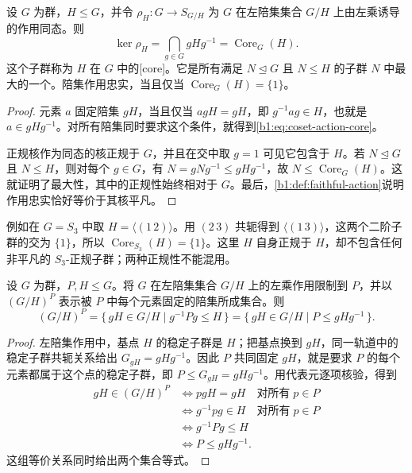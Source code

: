 \begin{proposition}[陪集作用的正规核]\label{b1:prop:coset-action-core}
	设 \(G\) 为群，\(H\leq G\)，并令 \(\rho_H:G\rightarrow S_{G/H}\) 为 \(G\) 在左陪集集合 \(G/H\) 上由左乘诱导的作用同态。则
	\begin{equation}\label{b1:eq:coset-action-core}
		\ker\rho_H=\bigcap_{g\in G}gHg^{-1} =\operatorname{Core}_G(H).
	\end{equation}
	这个子群称为 \(H\) 在 \(G\) 中的[core]。它是所有满足 \(N\trianglelefteq G\) 且 \(N\leq H\) 的子群 \(N\) 中最大的一个。陪集作用忠实，当且仅当 \(\operatorname{Core}_G(H)=\{1\}\)。
\end{proposition}
\begin{proof}
	元素 \(a\) 固定陪集 \(gH\)，当且仅当 \(agH=gH\)，即 \(g^{-1}ag\in H\)，也就是 \(a\in gHg^{-1}\)。对所有陪集同时要求这个条件，就得到\eqref{b1:eq:coset-action-core}。

	正规核作为同态的核正规于 \(G\)，并且在交中取 \(g=1\) 可见它包含于 \(H\)。若 \(N\trianglelefteq G\) 且 \(N\leq H\)，则对每个 \(g\in G\)，有 \(N=gNg^{-1}\leq gHg^{-1}\)，故 \(N\leq\operatorname{Core}_G(H)\)。这就证明了最大性，其中的正规性始终相对于 \(G\)。最后，\cref{b1:def:faithful-action}说明作用忠实恰好等价于其核平凡。
\end{proof}

例如在 \(G=S_3\) 中取 \(H=\bigl\langle(1\,2)\bigr\rangle\)。用 \((2\,3)\) 共轭得到 \(\bigl\langle(1\,3)\bigr\rangle\)，这两个二阶子群的交为 \(\{1\}\)，所以 \(\operatorname{Core}_{S_3}(H)=\{1\}\)。这里 \(H\) 自身正规于 \(H\)，却不包含任何非平凡的 \(S_3\)-正规子群；两种正规性不能混用。

\begin{corollary}[子群共同固定的陪集]\label{b1:cor:fixed-cosets-conjugate-containment}
	设 \(G\) 为群，\(P,H\leq G\)。将 \(G\) 在左陪集集合 \(G/H\) 上的左乘作用限制到 \(P\)，并以 \((G/H)^P\) 表示被 \(P\) 中每个元素固定的陪集所成集合。则
	\[
		(G/H)^P =\{\,gH\in G/H\mid g^{-1}Pg\leq H\,\} =\{\,gH\in G/H\mid P\leq gHg^{-1}\,\}.
	\]
\end{corollary}
\begin{proof}
	左陪集作用中，基点 \(H\) 的稳定子群是 \(H\)；把基点换到 \(gH\)，同一轨道中的稳定子群共轭关系给出 \(G_{gH}=gHg^{-1}\)。因此 \(P\) 共同固定 \(gH\)，就是要求 \(P\) 的每个元素都属于这个点的稳定子群，即 \(P\leq G_{gH}=gHg^{-1}\)。用代表元逐项核验，得到
	\[
		\begin{aligned}
			gH\in(G/H)^P &\iff pgH=gH\quad\text{对所有}\;p\in P\\
			&\iff g^{-1}pg\in H\quad\text{对所有}\;p\in P\\
			&\iff g^{-1}Pg\leq H\\
			&\iff P\leq gHg^{-1}.
		\end{aligned}
	\]
	这组等价关系同时给出两个集合等式。
\end{proof}

